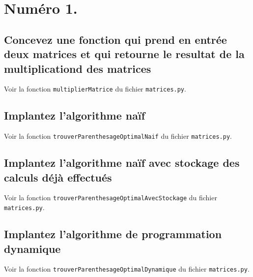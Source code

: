 \documentclass[10.9pt]{article} %
\begin{document}

\tableofcontents %

\newpage %



\section{Numéro 1.}

\subsection{Concevez une fonction qui prend en entrée deux matrices et qui
            retourne le resultat de la multiplicationd des matrices}
            
Voir la fonction \texttt{multiplierMatrice} du fichier \texttt{matrices.py}.

\subsection{Implantez l'algorithme naïf}

Voir la fonction \texttt{trouverParenthesageOptimalNaif} du fichier \texttt{matrices.py}.

\subsection{Implantez l'algorithme naïf avec stockage des calculs déjà effectués}

Voir la fonction \texttt{trouverParenthesageOptimalAvecStockage} du fichier \texttt{matrices.py}.

\subsection{Implantez l'algorithme de programmation dynamique}

Voir la fonction \texttt{trouverParenthesageOptimalDynamique} du fichier \texttt{matrices.py}.
\end{document}
